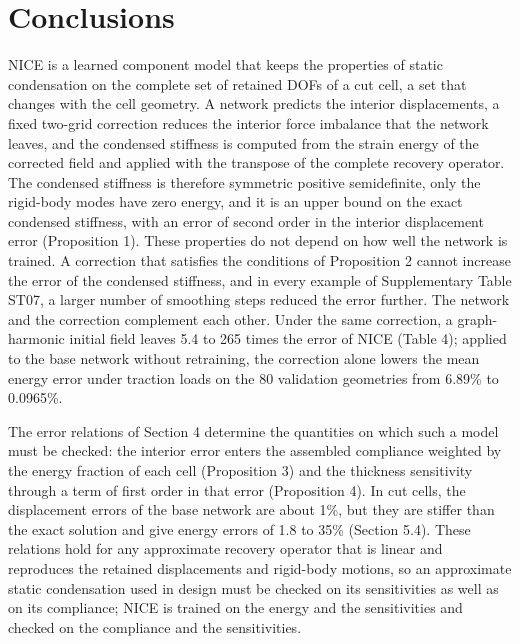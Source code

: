\documentclass[preprint,12pt,authoryear]{elsarticle}
\begin{document}
\section{Conclusions}

NICE is a learned component model that keeps the properties of static condensation on the complete set of retained DOFs of a cut cell, a set that changes with the cell geometry. A network predicts the interior displacements, a fixed two-grid correction reduces the interior force imbalance that the network leaves, and the condensed stiffness is computed from the strain energy of the corrected field and applied with the transpose of the complete recovery operator. The condensed stiffness is therefore symmetric positive semidefinite, only the rigid-body modes have zero energy, and it is an upper bound on the exact condensed stiffness, with an error of second order in the interior displacement error (Proposition 1). These properties do not depend on how well the network is trained. A correction that satisfies the conditions of Proposition 2 cannot increase the error of the condensed stiffness, and in every example of Supplementary Table ST07, a larger number of smoothing steps reduced the error further. The network and the correction complement each other. Under the same correction, a graph-harmonic initial field leaves 5.4 to 265 times the error of NICE (Table 4); applied to the base network without retraining, the correction alone lowers the mean energy error under traction loads on the 80 validation geometries from 6.89\% to 0.0965\%.

The error relations of Section 4 determine the quantities on which such a model must be checked: the interior error enters the assembled compliance weighted by the energy fraction of each cell (Proposition 3) and the thickness sensitivity through a term of first order in that error (Proposition 4). In cut cells, the displacement errors of the base network are about 1\%, but they are stiffer than the exact solution and give energy errors of 1.8 to 35\% (Section 5.4). These relations hold for any approximate recovery operator that is linear and reproduces the retained displacements and rigid-body motions, so an approximate static condensation used in design must be checked on its sensitivities as well as on its compliance; NICE is trained on the energy and the sensitivities and checked on the compliance and the sensitivities.
\end{document}
